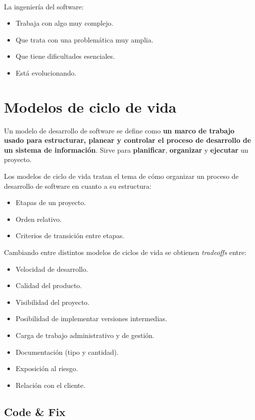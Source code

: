 \documentclass[]{article}
\begin{document}
~\newline

La ingeniería del software:
\begin{itemize}
	\item Trabaja con algo muy complejo.
	\item Que trata con una problemática muy amplia.
	\item Que tiene dificultades esenciales.
	\item Está evolucionando.
\end{itemize}


\newpage

\section{Modelos de ciclo de vida}
Un modelo de desarrollo de software se define como \textbf{un marco de trabajo usado para estructurar, planear y controlar el proceso de desarrollo de un sistema de información}. Sirve para \textbf{planificar}, \textbf{organizar} y \textbf{ejecutar} un proyecto.

Los modelos de ciclo de vida tratan el tema de cómo organizar un proceso de desarrollo de software en cuanto a su estructura:
\begin{itemize}
	\item Etapas de un proyecto.
	\item Orden relativo.
	\item Criterios de transición entre etapas.
\end{itemize}

Cambiando entre distintos modelos de ciclos de vida se obtienen \emph{tradeoffs} entre:
\begin{itemize}
 	\item Velocidad de desarrollo.
 	\item Calidad del producto.
 	\item Visibilidad del proyecto.
 	\item Posibilidad de implementar versiones intermedias.
 	\item Carga de trabajo administrativo y de gestión.
 	\item Documentación (tipo y cantidad).
 	\item Exposición al riesgo.
 	\item Relación con el cliente.
 \end{itemize}

\subsection{Code \& Fix}
\end{document}
